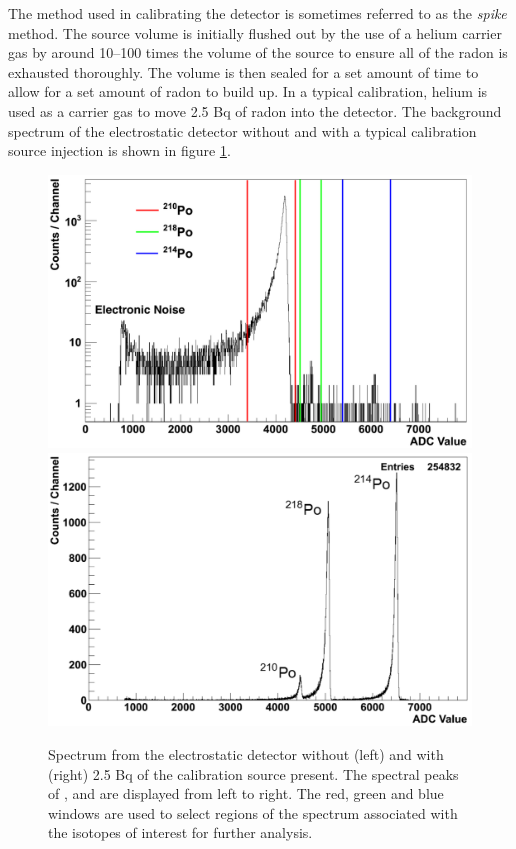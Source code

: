 The method used in calibrating the detector is sometimes referred to as the \textit{spike} method. The source volume is initially flushed out by the use of a helium carrier gas by around 10--100 times the volume of the source to ensure all of the radon is exhausted thoroughly. The volume is then sealed for a set amount of time to allow for a set amount of radon to build up. In a typical calibration, helium is used as a carrier gas to move 2.5 Bq of radon into the detector. The background spectrum of the electrostatic detector without and with a typical calibration source injection is shown in figure \ref{fig:background_calibration_spectrum}. 
%
\begin{figure}[hb!]
    \centering
    \includegraphics[scale=0.23]{Chapter_4/Figures/background_spectra.png}
    \includegraphics[scale=0.28]{Chapter_4/Figures/calibration_spectra.png}
    \caption[Spectrum from the electrostatic detector without and with 2.5 Bq of the calibration present.]
    {Spectrum from the electrostatic detector without (left) and with (right) 2.5 Bq of the calibration source present. The spectral peaks of \PoTOZ{}, \PoTOE{} and \PoTOF{} are displayed from left to right. The red, green and blue windows are used to select regions of the spectrum associated with the isotopes of interest for further analysis.}
    \label{fig:background_calibration_spectrum}
\end{figure}
%

